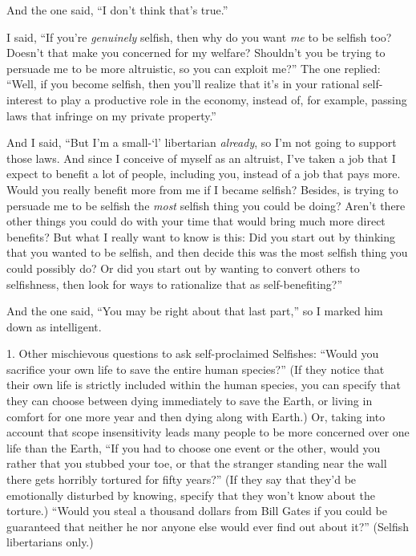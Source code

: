 {
 And the one said, ``I don't think
that's true.''}

{
 I said, ``If you're
\textit{genuinely} selfish, then why do you want \textit{me} to be
selfish too? Doesn't that make you concerned for my
welfare? Shouldn't you be trying to persuade me to be
more altruistic, so you can exploit me?'' The one
replied: ``Well, if you become selfish, then
you'll realize that it's in your
rational self-interest to play a productive role in the economy,
instead of, for example, passing laws that infringe on my private
property.''}

{
 And I said, ``But I'm a
small-`l' libertarian \textit{already},
so I'm not going to support those laws. And since I
conceive of myself as an altruist, I've taken a job
that I expect to benefit a lot of people, including you, instead of a
job that pays more. Would you really benefit more from me if I became
selfish? Besides, is trying to persuade me to be selfish the
\textit{most} selfish thing you could be doing? Aren't
there other things you could do with your time that would bring much
more direct benefits? But what I really want to know is this: Did you
start out by thinking that you wanted to be selfish, and then decide
this was the most selfish thing you could possibly do? Or did you start
out by wanting to convert others to selfishness, then look for ways to
rationalize that as self-benefiting?''}

{
 And the one said, ``You may be right about that
last part,'' so I marked him down as intelligent.}

\myendsectiontext


\bigskip

{
 1. Other mischievous questions to ask self-proclaimed Selfishes:
``Would you sacrifice your own life to save the entire
human species?'' (If they notice that their own life
is strictly included within the human species, you can specify that
they can choose between dying immediately to save the Earth, or living
in comfort for one more year and then dying along with Earth.) Or,
taking into account that scope insensitivity leads many people to be
more concerned over one life than the Earth, ``If you
had to choose one event or the other, would you rather that you stubbed
your toe, or that the stranger standing near the wall there gets
horribly tortured for fifty years?'' (If they say
that they'd be emotionally disturbed by knowing,
specify that they won't know about the torture.)
``Would you steal a thousand dollars from Bill Gates
if you could be guaranteed that neither he nor anyone else would ever
find out about it?'' (Selfish libertarians only.)}


